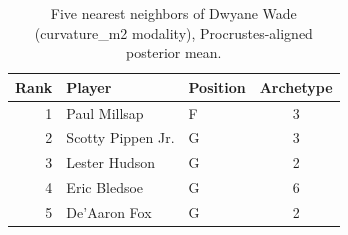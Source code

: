 \begin{table}[htbp]
  \centering\small
  \begin{tabular}{rllc}
    \toprule
    Rank & Player & Position & Archetype \\
    \midrule
    1 & Paul Millsap & F & 3 \\
    2 & Scotty Pippen Jr. & G & 3 \\
    3 & Lester Hudson & G & 2 \\
    4 & Eric Bledsoe & G & 6 \\
    5 & De'Aaron Fox & G & 2 \\
    \bottomrule
  \end{tabular}
  \caption{Five nearest neighbors of Dwyane Wade (curvature_m2 modality), Procrustes-aligned posterior mean.}
  \label{tab:Dwyane_Wade_neighbors_curvature_m2}
\end{table}

